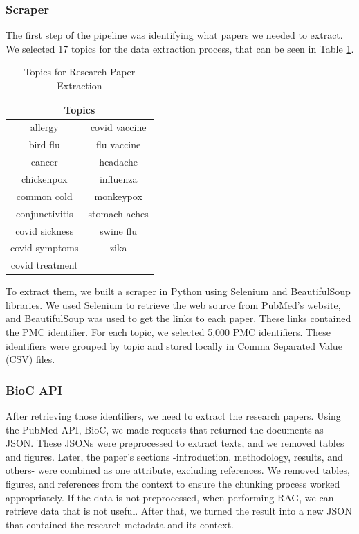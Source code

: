 \subsubsection{Scraper}
The first step of the pipeline was identifying what papers we needed to extract. We selected 17 topics for the data extraction process, that can be seen in Table \ref{table:topics}.

\begin{table}[!ht]
	\centering
	\caption{Topics for Research Paper Extraction}
	{\small 
	\begin{tabular}{||c | c||} 
			\hline
			 \multicolumn{2}{||c||}{\textbf{Topics}} \\ 
			\hline
			allergy  & covid vaccine \\ 
			\hline
			bird flu & flu vaccine \\ 
			\hline
			cancer & headache \\ 
			\hline
			chickenpox & influenza\\
			\hline
			common cold & monkeypox \\
			\hline
			conjunctivitis & stomach aches \\
			\hline
			covid sickness & swine flu \\
			\hline
			covid symptoms & zika\\ 
			\hline
			covid treatment &  \\ 
			\hline
			\end{tabular}
			}
	\label{table:topics}
\end{table}


To extract them, we built a scraper in Python using Selenium and BeautifulSoup libraries. We used Selenium to retrieve the web source from PubMed's website, and BeautifulSoup was used to get the links to each paper. These links contained the PMC identifier. For each topic, we selected 5,000 PMC identifiers. These identifiers were grouped by topic and stored locally in Comma Separated Value (CSV) files.

\subsubsection{BioC API}
After retrieving those identifiers, we need to extract the research papers. Using the PubMed API, BioC, we made requests that returned the documents as JSON. These JSONs were preprocessed to extract texts, and we removed tables and figures. Later, the paper's sections -introduction, methodology, results, and others- were combined as one attribute, excluding references. We removed tables, figures, and references from the context to ensure the chunking process worked appropriately. If the data is not preprocessed, when performing RAG, we can retrieve data that is not useful. After that, we turned the result into a new JSON that contained the research metadata and its context. 

